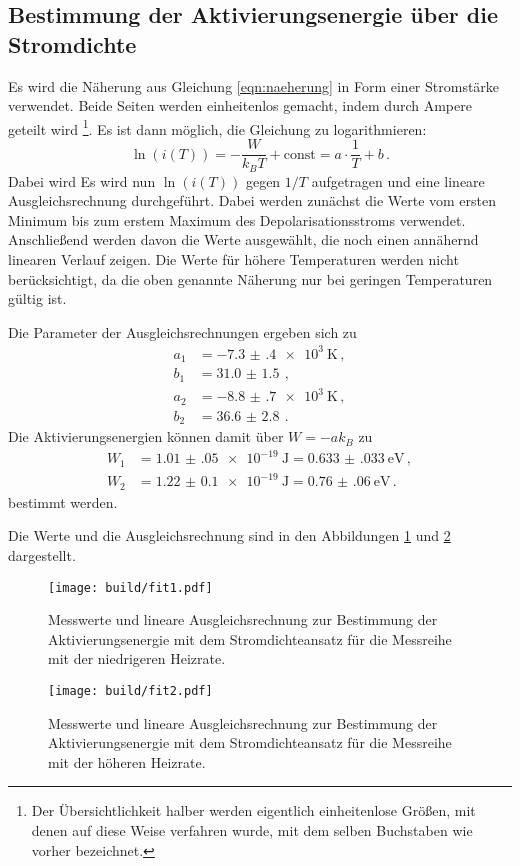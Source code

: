 \newpage
\subsection{Bestimmung der Aktivierungsenergie über die Stromdichte}

Es wird die Näherung aus Gleichung \eqref{eqn:naeherung} in Form einer Stromstärke verwendet. Beide Seiten werden einheitenlos gemacht, indem durch Ampere geteilt wird \footnote{Der Übersichtlichkeit halber werden eigentlich einheitenlose Größen, mit denen auf diese Weise verfahren wurde, mit dem selben Buchstaben wie vorher bezeichnet.}. Es ist dann möglich, die Gleichung zu logarithmieren:
\begin{equation*}
  \ln(i(T))=-\frac{W}{k_B T} + \text{const} =a\cdot \frac{1}{T} +b  \,.
\end{equation*}
Dabei wird
Es wird nun $\ln(i(T))$ gegen $1/T$ aufgetragen und eine lineare Ausgleichsrechnung
durchgeführt. Dabei werden zunächst die Werte vom ersten Minimum bis zum erstem Maximum
des Depolarisationsstroms verwendet. Anschließend werden davon die Werte ausgewählt, die
noch einen annähernd linearen Verlauf zeigen. Die Werte für höhere Temperaturen werden
nicht berücksichtigt, da die oben genannte Näherung nur bei geringen
Temperaturen gültig ist.

Die Parameter
der Ausgleichsrechnungen ergeben sich zu
\begin{align*}
  a_1&=\SI{-7.3(4)e+3}{\kelvin} \,, \\
  b_1&=\SI{31.0(15)}{}  \,, \\
  a_2&=\SI{-8.8(7)e+3}{\kelvin} \,, \\
  b_2&=\SI{36.6(28)}{}  \,.
\end{align*}
Die Aktivierungsenergien können damit über $W=-ak_B$ zu
\begin{align*}
 W_1&=\SI{1.01(05)e-19}{\joule}= \SI{0.633(033)}{\eV}  \,, \\
 W_2&=\SI{1.22(010)e-19}{\joule}=\SI{0.76(06)}{\eV} \,.
\end{align*}
bestimmt werden.

Die Werte und die Ausgleichsrechnung sind in den Abbildungen \ref{fig:fit1} und
\ref{fig:fit2} dargestellt.

\begin{figure}
  \centering
  \texttt{[image: build/fit1.pdf]}
  \caption{Messwerte und lineare Ausgleichsrechnung zur Bestimmung der Aktivierungsenergie mit dem Stromdichteansatz für
  die Messreihe mit der niedrigeren Heizrate.}
  \label{fig:fit1}
\end{figure}
\begin{figure}
  \centering
  \texttt{[image: build/fit2.pdf]}
  \caption{Messwerte und lineare Ausgleichsrechnung zur Bestimmung der Aktivierungsenergie mit dem Stromdichteansatz für
  die Messreihe mit der höheren Heizrate.}
  \label{fig:fit2}
\end{figure}

